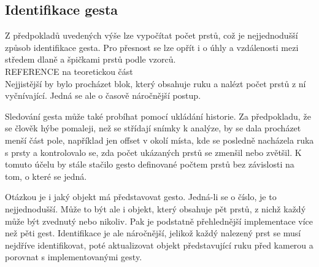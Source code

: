 \subsection{Identifikace gesta}
Z předpokladů uvedených výše lze vypočítat počet prstů, což je nejjednodušší způsob identifikace gesta. Pro přesnost se lze opřít i o úhly a vzdálenosti mezi středem dlaně a špičkami prstů podle vzorců.\\
REFERENCE na teoretickou část \\
Nejjistější by bylo procházet blok, který obsahuje ruku a nalézt počet prstů z ní vyčnívající. Jedná se ale o časově náročnější postup.

Sledování gesta může také probíhat pomocí ukládání historie. Za předpokladu, že se člověk hýbe pomaleji, než se střídají snímky k analýze, by se dala procházet menší část pole, například jen offset v okolí místa, kde se posledně nacházela ruka s prsty a kontrolovalo se, zda počet ukázaných prstů se zmenšil nebo zvětšil. K tomuto účelu by stále stačilo gesto definované počtem prstů bez závislosti na tom, o které se jedná.

Otázkou je i jaký objekt má představovat gesto. Jedná-li se o číslo, je to nejjednodušší. Může to být ale i objekt, který obsahuje pět prstů, z nichž každý může být zvednutý nebo nikoliv. Pak je podstatně přehlednější implementace více než pěti gest. Identifikace je ale náročnější, jelikož každý nalezený prst se musí nejdříve identifikovat, poté aktualizovat objekt představující ruku před kamerou a porovnat s implementovanými gesty. 




